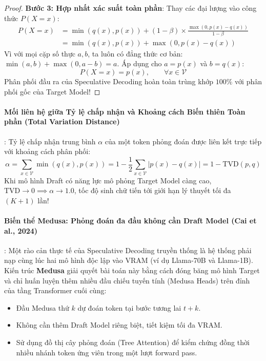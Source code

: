 \begin{proof}
\textbf{Bước 3: Hợp nhất xác suất toàn phần}:
Thay các đại lượng vào công thức $P(X = x)$:
\begin{align}
P(X = x) &= \min(q(x), p(x)) + (1 - \beta) \times \frac{\max(0, p(x) - q(x))}{1 - \beta} \nonumber \\
&= \min(q(x), p(x)) + \max(0, p(x) - q(x))
\end{align}
Vì với mọi cặp số thực $a, b$, ta luôn có đẳng thức cơ bản: $\min(a, b) + \max(0, a - b) = a$.
Áp dụng cho $a = p(x)$ và $b = q(x)$:
\begin{equation}
P(X = x) = p(x), \qquad \forall x \in \mathcal{V}
\end{equation}
Phân phối đầu ra của Speculative Decoding hoàn toàn trùng khớp $100\%$ với phân phối gốc của Target Model!
\end{proof}

\paragraph{Mối liên hệ giữa Tỷ lệ chấp nhận và Khoảng cách Biến thiên Toàn phần (Total Variation Distance)}:
Tỷ lệ chấp nhận trung bình $\alpha$ của một token phỏng đoán được liên kết trực tiếp với khoảng cách phân phối:
\begin{equation}
\alpha = \sum_{x \in \mathcal{V}} \min(q(x), p(x)) = 1 - \frac{1}{2} \sum_{x \in \mathcal{V}} |p(x) - q(x)| = 1 - \text{TVD}(p, q)
\end{equation}
Khi mô hình Draft có năng lực mô phỏng Target Model càng cao, $\text{TVD} \to 0 \implies \alpha \to 1.0$, tốc độ sinh chữ tiến tới giới hạn lý thuyết tối đa $(K+1)$ lần!

\paragraph{Biến thể Medusa: Phỏng đoán đa đầu không cần Draft Model (Cai et al., 2024)}:
Một rào cản thực tế của Speculative Decoding truyền thống là hệ thống phải nạp cùng lúc hai mô hình độc lập vào VRAM (ví dụ Llama-70B và Llama-1B). Kiến trúc \textbf{Medusa} giải quyết bài toán này bằng cách đóng băng mô hình Target và chỉ huấn luyện thêm nhiều đầu chiếu tuyến tính (Medusa Heads) trên đỉnh của tầng Transformer cuối cùng:
\begin{itemize}
  \item Đầu Medusa thứ $k$ dự đoán token tại bước tương lai $t+k$.
  \item Không cần thêm Draft Model riêng biệt, tiết kiệm tối đa VRAM.
  \item Sử dụng đồ thị cây phỏng đoán (Tree Attention) để kiểm chứng đồng thời nhiều nhánh token ứng viên trong một lượt forward pass.
\end{itemize}

